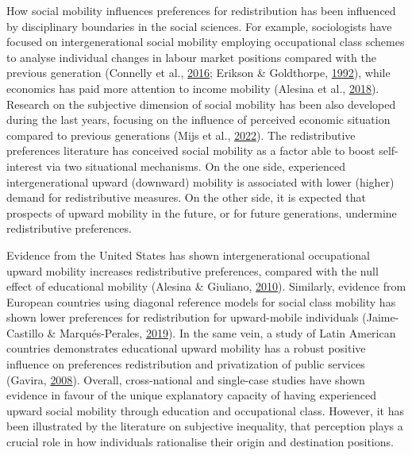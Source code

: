 \documentclass[
  12pt,
]{book}
\begin{document}
How social mobility influences preferences for redistribution has been influenced by disciplinary boundaries in the social sciences. For example, sociologists have focused on intergenerational social mobility employing occupational class schemes to analyse individual changes in labour market positions compared with the previous generation (Connelly et al., \protect\hyperlink{ref-Connelly2016}{2016}; Erikson \& Goldthorpe, \protect\hyperlink{ref-Erikson1992}{1992}), while economics has paid more attention to income mobility (Alesina et al., \protect\hyperlink{ref-alesina_intergenerational_2018}{2018}). Research on the subjective dimension of social mobility has been also developed during the last years, focusing on the influence of perceived economic situation compared to previous generations (Mijs et al., \protect\hyperlink{ref-mijs_belief_2022}{2022}). The redistributive preferences literature has conceived social mobility as a factor able to boost self-interest via two situational mechanisms. On the one side, experienced intergenerational upward (downward) mobility is associated with lower (higher) demand for redistributive measures. On the other side, it is expected that prospects of upward mobility in the future, or for future generations, undermine redistributive preferences.

Evidence from the United States has shown intergenerational occupational upward mobility increases redistributive preferences, compared with the null effect of educational mobility (Alesina \& Giuliano, \protect\hyperlink{ref-alesina_preferences_2010}{2010}). Similarly, evidence from European countries using diagonal reference models for social class mobility has shown lower preferences for redistribution for upward-mobile individuals (Jaime-Castillo \& Marqués-Perales, \protect\hyperlink{ref-jaime-castillo_social_2019}{2019}). In the same vein, a study of Latin American countries demonstrates educational upward mobility has a robust positive influence on preferences redistribution and privatization of public services (Gavira, \protect\hyperlink{ref-gavira_social_2008}{2008}). Overall, cross-national and single-case studies have shown evidence in favour of the unique explanatory capacity of having experienced upward social mobility through education and occupational class. However, it has been illustrated by the literature on subjective inequality, that perception plays a crucial role in how individuals rationalise their origin and destination positions.
\end{document}
